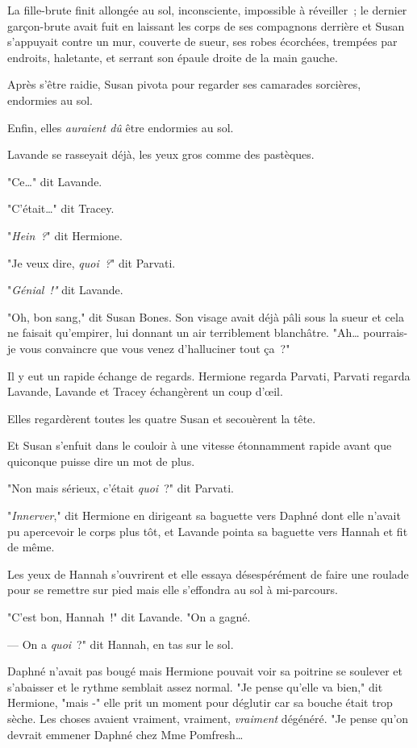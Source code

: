 La fille-brute finit allongée au sol, inconsciente, impossible à réveiller~; le dernier garçon-brute avait fuit en laissant les corps de ses compagnons derrière et Susan s'appuyait contre un mur, couverte de sueur, ses robes écorchées, trempées par endroits, haletante, et serrant son épaule droite de la main gauche.

Après s'être raidie, Susan pivota pour regarder ses camarades sorcières, endormies au sol.

Enfin, elles \emph{auraient dû} être endormies au sol.

Lavande se rasseyait déjà, les yeux gros comme des pastèques.

"Ce…" dit Lavande.

"C'était…" dit Tracey.

"\emph{Hein~?}" dit Hermione.

"Je veux dire, \emph{quoi~?}" dit Parvati.

"\emph{Génial~!"} dit Lavande.

"Oh, bon sang," dit Susan Bones. Son visage avait déjà pâli sous la sueur et cela ne faisait qu'empirer, lui donnant un air terriblement blanchâtre. "Ah… pourrais-je vous convaincre que vous venez d'halluciner tout ça~?"

Il y eut un rapide échange de regards. Hermione regarda Parvati, Parvati regarda Lavande, Lavande et Tracey échangèrent un coup d'œil.

Elles regardèrent toutes les quatre Susan et secouèrent la tête.

Et Susan s'enfuit dans le couloir à une vitesse étonnamment rapide avant que quiconque puisse dire un mot de plus.

"Non mais sérieux, c'était \emph{quoi}~?" dit Parvati.

"\emph{Innerver}," dit Hermione en dirigeant sa baguette vers Daphné dont elle n'avait pu apercevoir le corps plus tôt, et Lavande pointa sa baguette vers Hannah et fit de même.

Les yeux de Hannah s'ouvrirent et elle essaya désespérément de faire une roulade pour se remettre sur pied mais elle s'effondra au sol à mi-parcours.

"C'est bon, Hannah~!" dit Lavande. "On a gagné.

--- On a \emph{quoi}~?" dit Hannah, en tas sur le sol.

Daphné n'avait pas bougé mais Hermione pouvait voir sa poitrine se soulever et s'abaisser et le rythme semblait assez normal. "Je pense qu'elle va bien," dit Hermione, "mais -" elle prit un moment pour déglutir car sa bouche était trop sèche. Les choses avaient vraiment, vraiment, \emph{vraiment} dégénéré. "Je pense qu'on devrait emmener Daphné chez Mme Pomfresh…

